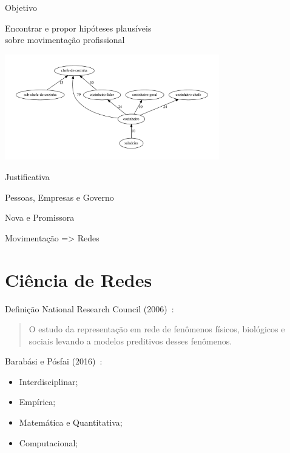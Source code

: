 \documentclass[10pt, hyperref={pdfpagelabels=false, unicode=true}, aspectratio=169]{beamer}
\begin{document}
{
\begin{frame}[c, label=objetivo]{Objetivo}
  \begin{center}
    \Large
    Encontrar e propor \alert{hipóteses} plausíveis\\
    sobre movimentação profissional
    
    \includegraphics[width=0.7\textwidth]{subcluster_01_11}
  \end{center}
\end{frame}

\begin{frame}[fragile, label=justificativa]{Justificativa}
  \begin{center}
    \Large
    \alert{Pessoas}, \alert{Empresas} e \alert{Governo}
    
    \vspace{\baselineskip}
    
    \alert{Nova} e \alert{Promissora}
    
    \vspace{\baselineskip}
    
    Movimentação => Redes
  \end{center}
\end{frame}
}

\section{Ciência de Redes}

\begin{frame}[label=definicao]{Definição}
  National Research Council (2006)~\cite{National_Research_Council2006-lv}:
  \begin{quote}
    O estudo da representação em rede de fenômenos físicos, biológicos e sociais levando a modelos preditivos desses fenômenos.
  \end{quote}
  Barabási e Pósfai (2016)~\cite{Barabasi2016-rn}:
  \begin{itemize}
    \item Interdisciplinar;
    \item Empírica;
    \item Matemática e Quantitativa;
    \item Computacional;
  \end{itemize}
\end{frame}
\end{document}
